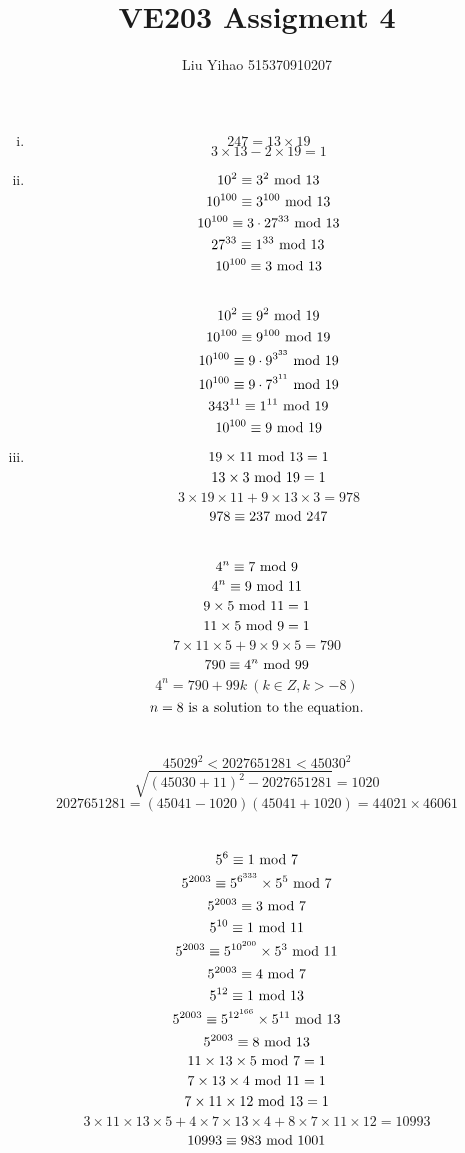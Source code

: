 \documentclass{article}
\title{VE203 Assigment 4}
\author{Liu Yihao 515370910207}
\date{}
\begin{document}
\maketitle

\section{}
\begin{enumerate}[i)]
\item
$$247=13\times19$$
$$3\times13-2\times19=1$$
\item
$$10^2\equiv3^2\ \rm{mod}\ 13$$
$$10^{100}\equiv3^{100}\ \rm{mod}\ 13$$
$$10^{100}\equiv3\cdot27^{33}\ \rm{mod}\ 13$$
$$27^{33}\equiv1^{33}\ \rm{mod}\ 13$$
$$10^{100}\equiv3\ \rm{mod}\ 13$$
\\
$$10^2\equiv9^2\ \rm{mod}\ 19$$
$$10^{100}\equiv9^{100}\ \rm{mod}\ 19$$
$$10^{100}\equiv9\cdot9^{3^{33}}\ \rm{mod}\ 19$$
$$10^{100}\equiv9\cdot7^{3^{11}}\ \rm{mod}\ 19$$
$$343^{11}\equiv1^{11}\ \rm{mod}\ 19$$
$$10^{100}\equiv9\ \rm{mod}\ 19$$
\item
$$19\times11\ \rm{mod}\ 13=1$$
$$13\times3\ \rm{mod}\ 19=1$$
$$3\times19\times11+9\times13\times3=978$$
$$978\equiv237\ \rm{mod}\ 247$$
\end{enumerate}

\section{}
$$4^n\equiv7\ \rm{mod}\ 9$$
$$4^n\equiv9\ \rm{mod}\ 11$$
$$9\times5\ \rm{mod}\ 11=1$$
$$11\times5\ \rm{mod}\ 9=1$$
$$7\times11\times5+9\times9\times5=790$$
$$790\equiv4^n\ \rm{mod}\ 99$$
$$4^n=790+99k\ (k\in Z,k>-8)$$
$$n=8\ \rm{is\ a\ solution\ to\ the\ equation.}$$

\section{}
$$45029^2<2027651281<45030^2$$
$$\sqrt{(45030+11)^2-2027651281}=1020$$
$$2027651281=(45041-1020)(45041+1020)=44021\times46061$$

\section{}
$$5^6\equiv1\ \rm{mod}\ 7$$
$$5^{2003}\equiv5^{6^{333}}\times5^5\ \rm{mod}\ 7$$
$$5^{2003}\equiv3\ \rm{mod}\ 7$$
$$5^{10}\equiv1\ \rm{mod}\ 11$$
$$5^{2003}\equiv5^{10^{200}}\times5^3\ \rm{mod}\ 11$$
$$5^{2003}\equiv4\ \rm{mod}\ 7$$
$$5^{12}\equiv1\ \rm{mod}\ 13$$
$$5^{2003}\equiv5^{12^{166}}\times5^{11}\ \rm{mod}\ 13$$
$$5^{2003}\equiv8\ \rm{mod}\ 13$$
$$11\times13\times5\ \rm{mod}\ 7=1$$
$$7\times13\times4\ \rm{mod}\ 11=1$$
$$7\times11\times12\ \rm{mod}\ 13=1$$
$$3\times11\times13\times5+4\times7\times13\times4+8\times7\times11\times12=10993$$
$$10993\equiv983\ \rm{mod}\ 1001$$
\end{document}
